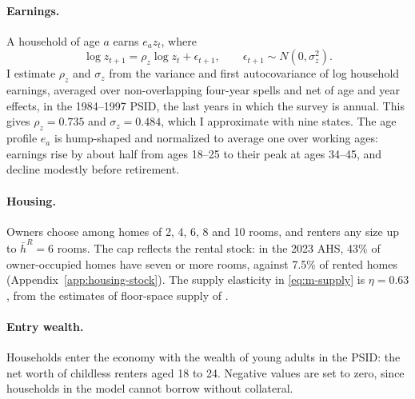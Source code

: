 \paragraph{Earnings.}
A household of age $a$ earns $e_az_t$, where
\begin{equation*}
 \log z_{t+1}=\rho_z\log z_t+\epsilon_{t+1},\qquad \epsilon_{t+1}\sim N(0,\sigma_z^2).
\end{equation*}
I estimate $\rho_z$ and $\sigma_z$ from the variance and first
autocovariance of log household earnings, averaged over non-overlapping
four-year spells and net of age and year effects, in the 1984--1997 PSID,
the last years in which the survey is annual. This gives $\rho_z=0.735$ and
$\sigma_z=0.484$, which I approximate with nine states. The age profile
$e_a$ is hump-shaped and normalized to average one over working ages:
earnings rise by about half from ages 18--25 to their peak at ages 34--45,
and decline modestly before retirement.

\paragraph{Housing.}
Owners choose among homes of 2, 4, 6, 8 and 10 rooms, and renters any size
up to $\bar h^R=6$ rooms. The cap reflects the rental stock: in the 2023 AHS,
43\% of owner-occupied homes have seven or more rooms, against 7.5\% of
rented homes (Appendix~\ref{app:housing-stock}). The supply elasticity in
\eqref{eq:m-supply} is $\eta=0.63$, from the estimates of floor-space supply of
\citet{baum-snowMicrogeographyHousingSupply2024}.

\paragraph{Entry wealth.}
Households enter the economy with the wealth of young adults in the PSID: the
net worth of childless renters aged 18 to 24.
Negative values are set to zero, since households
in the model cannot borrow without collateral.


